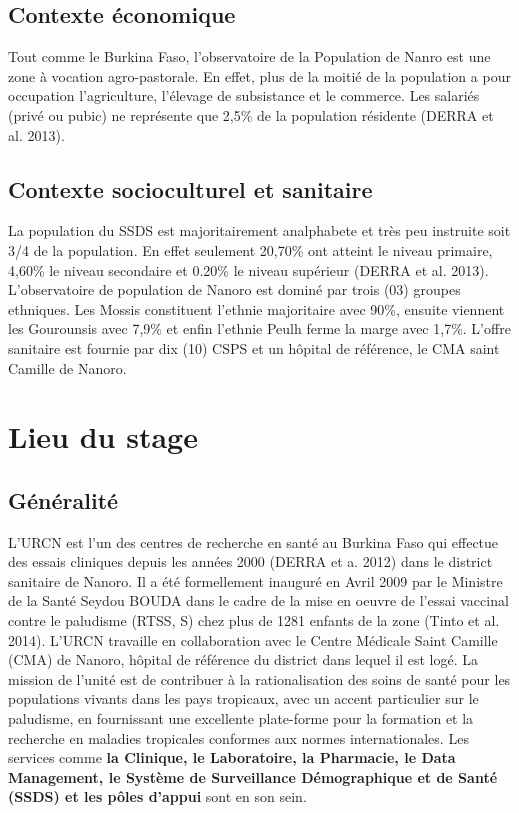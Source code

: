 \documentclass[12pt,a4paper]{report}
\begin{document}
			\subsection{Contexte économique}
			
			Tout comme le Burkina Faso, l'observatoire de la Population de Nanro est une zone à vocation agro-pastorale. En effet, plus de la moitié de la population a pour occupation l'agriculture, l'élevage de subsistance et le commerce. Les salariés (privé ou pubic) ne représente que 2,5\% de la population résidente (DERRA et al. 2013).
			
			\subsection{Contexte socioculturel et sanitaire}
			
			La population du SSDS est majoritairement analphabete et très peu instruite soit 3/4 de la population. En effet seulement 20,70\% ont atteint le niveau primaire, 4,60\% le niveau secondaire et 0.20\% le niveau supérieur (DERRA et al. 2013). L'observatoire de population de Nanoro est dominé par trois (03) groupes ethniques. Les Mossis constituent l'ethnie majoritaire avec 90\%, ensuite viennent les Gourounsis avec 7,9\% et enfin l'ethnie Peulh ferme la marge avec 1,7\%. L'offre sanitaire est fournie par dix (10) CSPS et un hôpital de référence, le CMA saint Camille de Nanoro.
			
		\section{Lieu du stage}
			\subsection{Généralité}
			
			L'URCN est l'un des centres de recherche en santé au Burkina Faso qui effectue des essais cliniques depuis les années 2000 (DERRA et a. 2012) dans le district sanitaire de Nanoro. Il a été formellement inauguré en Avril 2009 par le Ministre de la Santé Seydou BOUDA dans le cadre de la mise en oeuvre de l'essai vaccinal contre le paludisme (RTSS, S) chez plus de 1281 enfants de la zone (Tinto et al. 2014). L'URCN travaille en collaboration avec le Centre Médicale Saint Camille (CMA) de Nanoro, hôpital de référence du district dans lequel il est logé. La mission de l'unité est de contribuer à la rationalisation des soins de santé pour les populations vivants dans les pays tropicaux, avec un accent particulier sur le paludisme, en fournissant une excellente plate-forme pour la formation et la recherche en maladies tropicales conformes aux normes internationales. Les services comme \textbf{la Clinique, le Laboratoire, la Pharmacie, le Data Management, le Système de Surveillance Démographique et de Santé (SSDS) et les pôles d'appui} sont en son sein.
			
\end{document}
